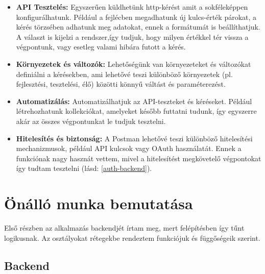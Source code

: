 \documentclass[a4paper,twoside]{article}
\begin{document}
\begin{itemize}
	\item \textbf{API Tesztelés:} Egyszerűen küldhetünk http-kérést amit a sokféleképpen konfigurálhatunk. Például a fejlécben megadhatunk új kulcs-érték párokat, a kérés törzsében adhatunk meg adatokat, ennek a formátumát is beállíthatjuk. A választ is kijelzi a rendszer,így tudjuk, hogy milyen értékkel tér vissza a végpontunk, vagy esetleg valami hibára futott a kérés. 
	\item \textbf{Környezetek és változók:} Lehetőségünk van környezeteket és változókat definiálni a kérésekben, ami lehetővé teszi különböző környezetek (pl. fejlesztési, tesztelési, élő) közötti könnyű váltást és paraméterezést.
	\item \textbf{Automatizálás:} Automatizálhatjuk az API-teszteket és kéréseket. Például létrehozhatunk kollekciókat, amelyeket később futtatni tudunk, így egyszerre akár az összes végpontunkat le tudjuk tesztelni. 
	\item \textbf{Hitelesítés és biztonság:} A Postman lehetővé teszi különböző hitelesítési mechanizmusok, például API kulcsok vagy OAuth használatát. Ennek a funkciónak nagy hasznát vettem, mivel a hitelesítést megkövetelő végpontokat így tudtam tesztelni (lásd: \ref{auth-backend}). 
\end{itemize}




\newpage



\section{Önálló munka bemutatása}
Első részben az alkalmazás backendjét írtam meg, mert felépítésben így tűnt
logikusnak. Az osztályokat rétegekbe rendeztem funkciójuk és függőségeik szerint.
\subsection{Backend}
\end{document}
